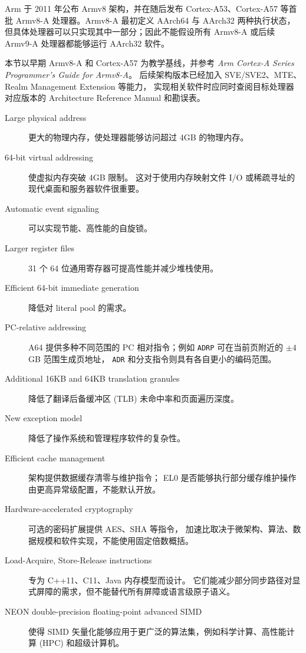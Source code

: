 Arm 于 2011 年公布 Armv8 架构，并在随后发布 Cortex-A53、Cortex-A57 等首批
Armv8-A 处理器。Armv8-A 最初定义 AArch64 与 AArch32 两种执行状态，
但具体处理器可以只实现其中一部分；因此不能假设所有 Armv8-A 或后续 Armv9-A
处理器都能够运行 AArch32 软件。

本节以早期 Armv8-A 和 Cortex-A57 为教学基线，并参考
\emph{Arm Cortex-A Series Programmer's Guide for Armv8-A}\cite{armpg}。
后续架构版本已经加入 SVE/SVE2、MTE、Realm Management Extension 等能力，
实现相关软件时应同时查阅目标处理器对应版本的 Architecture Reference Manual 和勘误表。

\begin{description}
    \item[Large physical address] 更大的物理内存，使处理器能够访问超过 4GB 的物理内存。
    \item[64-bit virtual addressing] 使虚拟内存突破 4GB 限制。
    这对于使用内存映射文件 I/O 或稀疏寻址的现代桌面和服务器软件很重要。
    \item[Automatic event signaling] 可以实现节能、高性能的自旋锁。
    \item[Larger register files] 31 个 64 位通用寄存器可提高性能并减少堆栈使用。
    \item[Efficient 64-bit immediate generation] 降低对 literal pool 的需求。
    \item[PC-relative addressing] A64 提供多种不同范围的 PC 相对指令；例如
      \texttt{ADRP} 可在当前页附近的 $\pm 4$GB 范围生成页地址，
      \texttt{ADR} 和分支指令则具有各自更小的编码范围。
    \item[Additional 16KB and 64KB translation granules] 降低了翻译后备缓冲区 (TLB) 未命中率和页面遍历深度。
    \item[New exception model] 降低了操作系统和管理程序软件的复杂性。
    \item[Efficient cache management] 架构提供数据缓存清零与维护指令；
      EL0 是否能够执行部分缓存维护操作由更高异常级配置，不能默认开放。
    \item[Hardware-accelerated cryptography] 可选的密码扩展提供 AES、SHA 等指令，
      加速比取决于微架构、算法、数据规模和软件实现，不能使用固定倍数概括。
    \item[Load-Acquire, Store-Release instructions] 专为 C++11、C11、Java 内存模型而设计。
    它们能减少部分同步路径对显式屏障的需求，但不能替代所有屏障或语言级原子语义。
    \item[NEON double-precision floating-point advanced SIMD] 使得 SIMD 矢量化能够应用于更广泛的算法集，例如科学计算、高性能计算 (HPC) 和超级计算机。
\end{description}



















